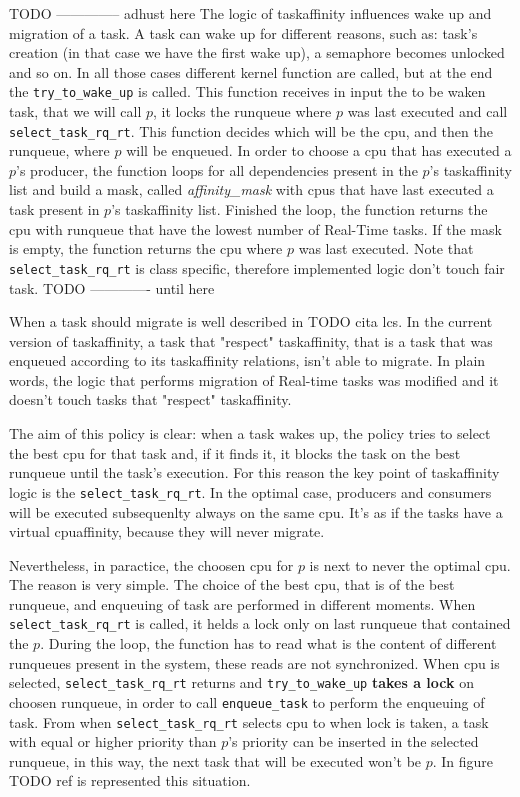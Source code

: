 TODO -------------- adhust here
The logic of taskaffinity influences wake up and migration of a task. A task can wake up for different reasons, such as: task's creation (in that case 
we have the first wake up), a semaphore becomes unlocked and so on. In all those cases different kernel function are called, but at the end the 
\texttt{try\_to\_wake\_up} is called. This function receives in input the to be waken task, that we will call $p$, it locks the runqueue where $p$ was last 
executed and call \texttt{select\_task\_rq\_rt}. This function decides which will be the cpu, and then the runqueue, where $p$ will be enqueued. In order 
to choose a cpu that has executed a $p$'s producer, the function loops for all dependencies present in the $p$'s taskaffinity list and build a mask, 
called \textit{affinity\_mask} with cpus that have last executed a task present in $p$'s taskaffinity list. Finished the loop, the function returns the cpu 
with runqueue that have the lowest number of Real-Time tasks. If the mask is empty, the function returns the cpu where $p$ was last executed. Note that 
\texttt{select\_task\_rq\_rt} is class specific, therefore implemented logic don't touch fair task.
TODO ------------- until here

When a task should migrate is well described in TODO cita lcs. In the current version of taskaffinity, a task that "respect" taskaffinity, that is a task 
that was enqueued according to its taskaffinity relations, isn't able to migrate. In plain words, the logic that performs migration of 
Real-time tasks was modified and it doesn't touch tasks that "respect" taskaffinity.

The aim of this policy is clear: when a task wakes up, the policy tries to select the best cpu for that task and, if it finds it, it blocks the task on the 
best runqueue until the task's execution. For this reason the key point of taskaffinity logic is the \texttt{select\_task\_rq\_rt}. In the optimal case, 
producers and consumers will be executed subsequenlty always on the same cpu. It's as if the tasks have a virtual cpuaffinity, because they will never 
migrate.

Nevertheless, in paractice, the choosen cpu for $p$ is next to never the optimal cpu. The reason is very simple. The choice of the best 
cpu, that is of the best runqueue, and enqueuing of task are performed in different moments. When \texttt{select\_task\_rq\_rt} is called, it helds a lock 
only on last runqueue that contained the $p$. During the loop, the function has to read what is the content of different runqueues present in 
the system, these reads are not synchronized. When cpu is selected, \texttt{select\_task\_rq\_rt} returns and \texttt{try\_to\_wake\_up} \textbf{takes 
a lock} on choosen runqueue, in order to call \texttt{enqueue\_task} to perform the enqueuing of task. From when \texttt{select\_task\_rq\_rt} selects cpu 
to when lock is taken, a task with equal or higher priority than $p$'s priority can be inserted in the selected runqueue, in this way, the next task that 
will be executed won't be $p$. In figure TODO ref is represented this situation.

